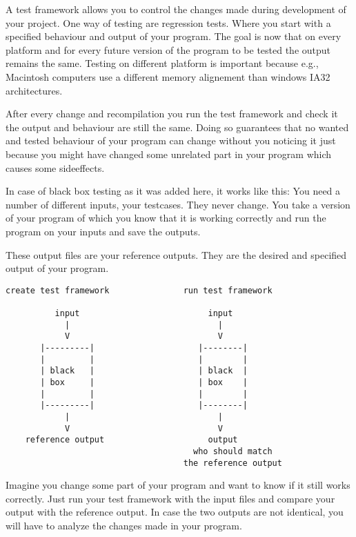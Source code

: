 \documentclass[11pt,twoside,a4paper,draft]{article}
\begin{document}
A test framework allows you to control the changes made during development
of your project. One way of testing are regression tests. Where you 
start with a specified behaviour and output of your program. The goal is
now that on every platform and for every future version of the program to
be tested the output remains the same. Testing on different platform is 
important because e.g., Macintosh computers use a different memory alignement
than windows IA32 architectures.

After every change and recompilation you run the test framework and check
it the output and behaviour are still the same. Doing so guarantees that
no wanted and tested behaviour of your program can change without you 
noticing it just because you might have changed some unrelated part
in your program which causes some sideeffects.

In case of black box testing as it was added here, it works like this:
You need a number of different inputs, your testcases. They never change.
You take a version of your program of which you know that it is working
correctly and run the program on your inputs and save the outputs.

These output files are your reference outputs. They are the desired
and specified output of your program.

\begin{verbatim}
create test framework               run test framework

          input                          input
            |                              |
            V                              V
       |---------|                     |--------|
       |         |                     |        |
       | black   |                     | black  |
       | box     |                     | box    |
       |         |                     |        |
       |---------|                     |--------|
            |                              |
            V                              V
    reference output                     output
                                      who should match
                                    the reference output
\end{verbatim}

Imagine you change some part of your program and want to know if it 
still works correctly. Just run your test framework with the input files
and compare your output with the reference output. In case the two
outputs are not identical, you will have to analyze the changes 
made in your program.
\end{document}
